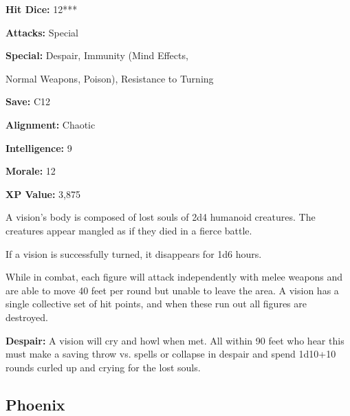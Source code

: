 \begin{multicols*}{2}
{\textbf{Hit Dice:} 12***

\textbf{Attacks:} Special

\textbf{Special:} Despair, Immunity (Mind Effects, 

Normal Weapons, Poison), Resistance to Turning

\textbf{Save:} C12

\textbf{Alignment:} Chaotic

\textbf{Intelligence:} 9

\textbf{Morale:} 12

\textbf{XP Value:} 3,875}

A vision’s body is composed of lost souls of 2d4 humanoid creatures. The creatures appear mangled as if they died in a fierce battle.

If a vision is successfully turned, it disappears for 1d6 hours.

While in combat, each figure will attack independently with melee weapons and are able to move 40 feet per round but unable to leave the area. A vision has a single collective set of hit points, and when these run out all figures are destroyed.

\textbf{Despair:} A vision will cry and howl when met. All within 90 feet who hear this must make a saving throw vs. spells or collapse in despair and spend 1d10+10 rounds curled up and crying for the lost souls.

\subsection{Phoenix}
\end{multicols*}
